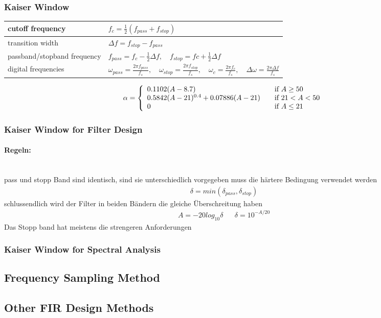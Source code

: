 \subsubsection{Kaiser Window}
\begin{tabular}{|l|l|}
	\hline
	cutoff frequency & $f_c=\frac{1}{2}(f_{pass}+f_{stop})$ \\ \hline
	transition width & $\Delta f = f_{stop}-f_{pass}$\\ \hline
	passband/stopband frequency & $f_{pass} = f_c - \frac{1}{2}\Delta f,\quad f_{stop}= fc+\frac{1}{2}\Delta f$\\ \hline
	digital frequencies & $\omega_{pass}=\frac{2\pi f_{pass}}{f_s},\quad \omega_{stop}=\frac{2\pi f_{stop}}{f_s},\quad
						  \omega_{c}=\frac{2\pi f_c}{f_s},\quad \Delta\omega=\frac{2\pi \Delta f}{f_s}$\\

	\hline						  
\end{tabular}


\begin{align*}
	\alpha = \left\{
		\begin{array}{l l}
			0.1102(A-8.7)& \quad \text{if } A \geq 50\\
			0.5842(A-21)^{0.4}+0.07886(A-21) & \quad \text{if }21 < A < 50\\
			0 & \quad \text{if } A \leq 21
		\end{array} \right.
\end{align*}
\subsubsection{Kaiser Window for Filter Design}


\paragraph{Regeln:}~\\
pass und stopp Band sind identisch, sind sie unterschiedlich vorgegeben muss die härtere Bedingung verwendet werden \\
\begin{align*}
\delta=min(\delta_{pass},\delta_{stop})
\end{align*}
schlussendlich wird der Filter in beiden Bändern die gleiche Überschreitung haben
\begin{align*}
A=-20log_{10}\delta && \delta=10^{-A/20}
\end{align*}
Das Stopp band hat meistens die strengeren Anforderungen
\subsubsection{Kaiser Window for Spectral Analysis}

\subsection{Frequency Sampling Method}

\subsection{Other FIR Design Methods}

